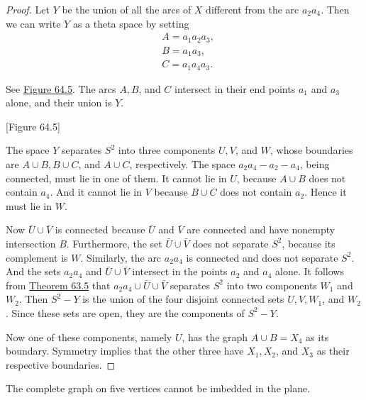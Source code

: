 \begin{proof}
Let \(Y\) be the union of all the arcs of \(X\) different from the arc \(a_{2}a_{4}\). Then we can write \(Y\) as a theta space by setting
\[
\begin{aligned} & A = a_{1}a_{2}a_{3}, \\ & B = a_{1}a_{3}, \\ & C = a_{1}a_{4}a_{3}. \end{aligned}
\]

See \hyperref[fig:64.5]{Figure 64.5}. The arcs \(A,B\), and \(C\) intersect in their end points \(a_{1}\) and \(a_{3}\) alone, and their union is \(Y\).

[Figure 64.5]

The space \(Y\) separates \(S^{2}\) into three components \(U,V\), and \(W\), whose boundaries are \(A \cup B,B \cup C\), and \(A \cup C\), respectively. The space \(a_{2}a_{4} - a_{2} - a_{4}\), being connected, must lie in one of them. It cannot lie in \(U\), because \(A \cup B\) does not contain \(a_{4}\). And it cannot lie in \(V\) because \(B \cup C\) does not contain \(a_{2}\). Hence it must lie in \(W\).

Now \(\bar{U} \cup \bar{V}\) is connected because \(\bar{U}\) and \(\bar{V}\) are connected and have nonempty intersection \(B\). Furthermore, the set \(\bar{U} \cup \bar{V}\) does not separate \(S^{2}\), because its complement is \(W\). Similarly, the arc \(a_{2}a_{4}\) is connected and does not separate \(S^{2}\). And the sets \(a_{2}a_{4}\) and \(\bar{U} \cup \bar{V}\) intersect in the points \(a_{2}\) and \(a_{4}\) alone. It follows from \hyperref[thm:63.5]{Theorem 63.5} that \(a_{2}a_{4} \cup \bar{U} \cup \bar{V}\) separates \(S^{2}\) into two components \(W_{1}\) and \(W_{2}\). Then \(S^{2} - Y\) is the union of the four disjoint connected sets \(U,V,W_{1}\), and \(W_{2}\). Since these sets are open, they are the components of \(S^{2} - Y\).

Now one of these components, namely \(U\), has the graph \(A \cup B = X_{4}\) as its boundary. Symmetry implies that the other three have \(X_{1},X_{2}\), and \(X_{3}\) as their respective boundaries.
\end{proof}
\begin{theorem}
\label{thm:\thetheorem}
The complete graph on five vertices cannot be imbedded in the plane.
\end{theorem}

